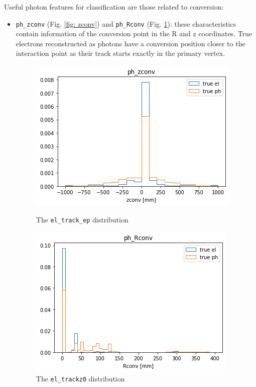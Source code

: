 \documentclass[a4paper, oneside, 11pt, openright]{book}
\begin{document}
					Useful photon features for classification are those related to conversion:
					\begin{itemize}
						\item \texttt{ph\_zconv} (Fig. \ref{fig: zconv}) and \texttt{ph\_Rconv} (Fig. \ref{fig: Rconv}): these characteristics contain information of the conversion point in the R and z coordinates. True electrons reconstructed as photons have a conversion position closer to the interaction point as their track starts exactly in the primary vertex. 
						
						\begin{figure}[h!]
							\begin{minipage}[b]{0.5\linewidth}
								\centering
								\includegraphics[width=.9\linewidth]{tesi_images/ph_zconv.png} 
								\caption{The \texttt{el\_track\_ep} distribution} 
								\label{fig: zconv}
								\vspace{4ex}
							\end{minipage}%
							\begin{minipage}[b]{0.5\linewidth}
								\centering
								\includegraphics[width=.9\linewidth]{tesi_images/ph_Rconv.png} 
								\caption{The \texttt{el\_trackz0} distribution}
								\label{fig: Rconv} 
								\vspace{4ex}
							\end{minipage} 
						\end{figure}
						

\end{itemize}
\end{document}
